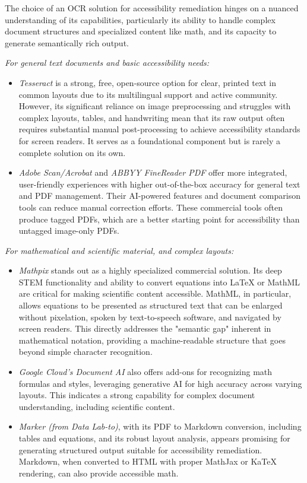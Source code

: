 The choice of an OCR solution for accessibility remediation hinges on a nuanced understanding of its capabilities, particularly its ability to handle complex document structures and specialized content like math, and its capacity to generate semantically rich output.

\emph{For general text documents and basic accessibility needs:}
\begin{itemize}
    \item \emph{Tesseract} is a strong, free, open-source option for clear, printed text in common layouts due to its multilingual support and active community. \cite{KoncileTesseract, IronSoftwareTesseract} However, its significant reliance on image preprocessing and struggles with complex layouts, tables, and handwriting  \cite{KoncileTesseract} mean that its raw output often requires substantial manual post-processing to achieve accessibility standards for screen readers. It serves as a foundational component but is rarely a complete solution on its own.
    \item \emph{Adobe Scan/Acrobat} and \emph{ABBYY FineReader PDF} offer more integrated, user-friendly experiences with higher out-of-the-box accuracy for general text and PDF management. \cite{TechRadarOCR} Their AI-powered features and document comparison tools can reduce manual correction efforts. These commercial tools often produce tagged PDFs, which are a better starting point for accessibility than untagged image-only PDFs. \cite{UWDocInfo}
\end{itemize}

\emph{For mathematical and scientific material, and complex layouts:}
\begin{itemize}
    \item \emph{Mathpix} stands out as a highly specialized commercial solution. Its deep STEM functionality and ability to convert equations into LaTeX or MathML  \cite{Mathpix} are critical for making scientific content accessible. MathML, in particular, allows equations to be presented as structured text that can be enlarged without pixelation, spoken by text-to-speech software, and navigated by screen readers. \cite{TPGIMathAccessible} This directly addresses the "semantic gap" inherent in mathematical notation, providing a machine-readable structure that goes beyond simple character recognition.
    \item \emph{Google Cloud's Document AI} also offers add-ons for recognizing math formulas and styles, leveraging generative AI for high accuracy across varying layouts. \cite{CloudGoogleOCR} This indicates a strong capability for complex document understanding, including scientific content.
    \item \emph{Marker (from Data Lab-to)}, with its PDF to Markdown conversion, including tables and equations, and its robust layout analysis, appears promising for generating structured output suitable for accessibility remediation. \cite{Marker} Markdown, when converted to HTML with proper MathJax or KaTeX rendering, can also provide accessible math. \cite{TPGIMathAccessible}
\end{itemize}

